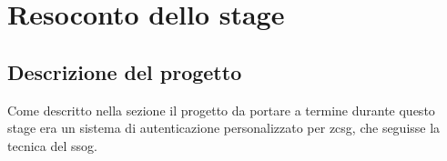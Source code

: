 
\chapter{Resoconto dello stage}
\label{cap:resoconto}

\section{Descrizione del progetto}
Come descritto nella sezione  il progetto da portare a termine durante questo stage era un sistema di autenticazione personalizzato per \gls{zcsg}, che seguisse la tecnica del \gls{ssog}. \\

